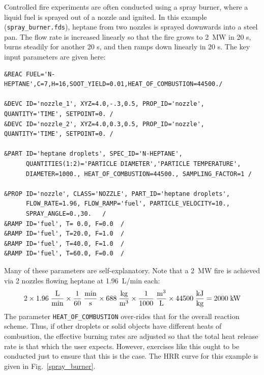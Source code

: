 \documentclass[11pt]{book}
\newcommand{\ct}{\tt\small}
\newcommand{\be}{\begin{equation}}
\newcommand{\ee}{\end{equation}}
\begin{document}
Controlled fire experiments are often conducted using a spray burner,
where a liquid fuel is sprayed out of a nozzle and ignited. In this
example ({\ct spray\_burner.fds}), heptane from two nozzles is
sprayed downwards into a steel pan.  The flow rate is increased
linearly so that the fire grows to 2~MW in 20 s, burns steadily for
another 20 s, and then ramps down linearly in 20 s. The key input
parameters are given here:

\footnotesize
\begin{verbatim}
&REAC FUEL='N-HEPTANE',C=7,H=16,SOOT_YIELD=0.01,HEAT_OF_COMBUSTION=44500./

&DEVC ID='nozzle_1', XYZ=4.0,-.3,0.5, PROP_ID='nozzle', QUANTITY='TIME', SETPOINT=0. /
&DEVC ID='nozzle_2', XYZ=4.0,0.3,0.5, PROP_ID='nozzle', QUANTITY='TIME', SETPOINT=0. /

&PART ID='heptane droplets', SPEC_ID='N-HEPTANE',
      QUANTITIES(1:2)='PARTICLE DIAMETER','PARTICLE TEMPERATURE',
      DIAMETER=1000., HEAT_OF_COMBUSTION=44500., SAMPLING_FACTOR=1 /

&PROP ID='nozzle', CLASS='NOZZLE', PART_ID='heptane droplets',
      FLOW_RATE=1.96, FLOW_RAMP='fuel', PARTICLE_VELOCITY=10.,
      SPRAY_ANGLE=0.,30.   /
&RAMP ID='fuel', T= 0.0, F=0.0  /
&RAMP ID='fuel', T=20.0, F=1.0  /
&RAMP ID='fuel', T=40.0, F=1.0  /
&RAMP ID='fuel', T=60.0, F=0.0  /
\end{verbatim}
\normalsize

\noindent
Many of these parameters are self-explanatory. Note that a 2~MW fire is achieved via 2 nozzles flowing heptane at 1.96~L/min each:
\be 2 \times 1.96 \; \frac{\hbox{L}}{\hbox{min}} \times \frac{1}{60} \; \frac{\hbox{min}}{\hbox{s}} \times 688 \;
\frac{\hbox{kg}}{\hbox{m}^3} \times \frac{1}{1000} \; \frac{\hbox{m}^3}{\hbox{L}} \times 44500 \;
\frac{\hbox{kJ}}{\hbox{kg}} = 2000 \; \hbox{kW} \ee
The parameter {\ct HEAT\_OF\_COMBUSTION} over-rides that for the overall
reaction scheme. Thus, if other droplets or solid objects have different
heats of combustion, the effective burning rates are adjusted so that the
total heat release rate is that which the user expects. However, exercises
like this ought to be conducted just to ensure that this is the case.
The HRR curve for this example is given in Fig.~\ref{spray_burner}.
\end{document}
